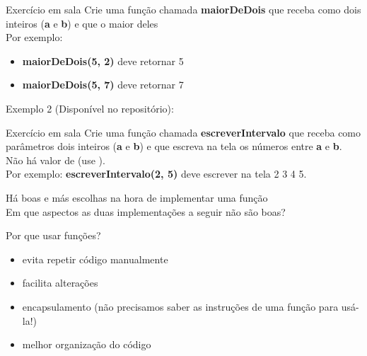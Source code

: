\documentclass[portuguese,10pt,xcolor=table]{bredelebeamer}
\begin{document}
		\begin{frame}
			\begin{alertblock}{ Exercício em sala}
				Crie uma função chamada \textbf{maiorDeDois} que receba como  dois inteiros (\textbf{a} e \textbf{b}) e que  o maior deles\\
				Por exemplo: 
				\begin{itemize}
					\item				\textbf{maiorDeDois(5, 2)} deve retornar 5
					\item \textbf{maiorDeDois(5, 7)} deve retornar 7
				\end{itemize}
			\end{alertblock}
		\end{frame}

		\begin{frame}
			Exemplo 2 (Disponível no repositório):
				
		\end{frame}


		\begin{frame}
			\begin{alertblock}{ Exercício em sala}
				Crie uma função chamada \textbf{escreverIntervalo} que receba como parâmetros dois inteiros (\textbf{a} e \textbf{b}) e que escreva na tela os números entre \textbf{a} e \textbf{b}. Não há valor de  (use \textdf{void}).\\
				Por exemplo: \textbf{escreverIntervalo(2, 5)} deve escrever na tela 2 3 4 5.
			\end{alertblock}
		\end{frame}


		\begin{frame}
			Há boas e más escolhas na hora de implementar uma função
			\\Em que aspectos as duas implementações a seguir não são boas?
				
				
		\end{frame}


	\begin{frame}
		Por que usar funções? 
		\begin{itemize}
			\item evita repetir código manualmente
			\item facilita alterações
			\item encapsulamento (não precisamos saber as instruções de uma função para usá-la!)
			\item melhor organização do código
		\end{itemize}
	\end{frame}
\end{document}
